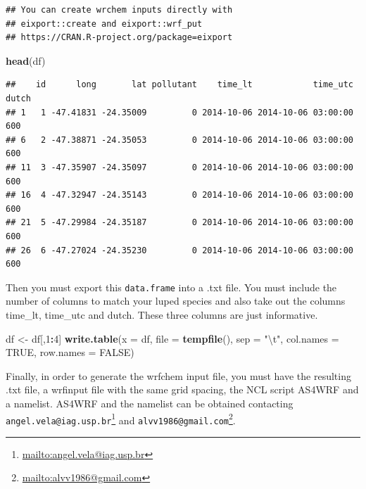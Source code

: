 \documentclass[12pt,graybox,envcountchap,sectrefs]{krantz}
\makeatletter
\newenvironment{Shaded}{\begin{snugshade}}{\end{snugshade}}
\newcommand{\KeywordTok}[1]{\textcolor[rgb]{0.13,0.29,0.53}{\textbf{#1}}}
\newcommand{\DataTypeTok}[1]{\textcolor[rgb]{0.13,0.29,0.53}{#1}}
\newcommand{\DecValTok}[1]{\textcolor[rgb]{0.00,0.00,0.81}{#1}}
\newcommand{\CharTok}[1]{\textcolor[rgb]{0.31,0.60,0.02}{#1}}
\newcommand{\StringTok}[1]{\textcolor[rgb]{0.31,0.60,0.02}{#1}}
\newcommand{\OtherTok}[1]{\textcolor[rgb]{0.56,0.35,0.01}{#1}}
\newcommand{\OperatorTok}[1]{\textcolor[rgb]{0.81,0.36,0.00}{\textbf{#1}}}
\newcommand{\NormalTok}[1]{#1}
\renewcommand{\href}[2]{#2\footnote{\url{#1}}}
\newenvironment{kframe}{%
\medskip{}
\setlength{\fboxsep}{.8em}
 \def\at@end@of@kframe{}%
 \ifinner\ifhmode%
  \def\at@end@of@kframe{\end{minipage}}%
  \begin{minipage}{\columnwidth}%
 \fi\fi%
 \def\FrameCommand##1{\hskip\@totalleftmargin \hskip-\fboxsep
 \colorbox{shadecolor}{##1}\hskip-\fboxsep
     \hskip-\linewidth \hskip-\@totalleftmargin \hskip\columnwidth}%
 \MakeFramed {\advance\hsize-\width
   \@totalleftmargin\z@ \linewidth\hsize
   \@setminipage}}%
 {\par\unskip\endMakeFramed%
 \at@end@of@kframe}
\renewenvironment{Shaded}{\begin{kframe}}{\end{kframe}}
\theoremstyle{definition}
\theoremstyle{definition}
\theoremstyle{definition}
\theoremstyle{remark}
\makeatother
\begin{document}
\begin{verbatim}
## You can create wrchem inputs directly with 
## eixport::create and eixport::wrf_put
## https://CRAN.R-project.org/package=eixport
\end{verbatim}

\begin{Shaded}
\begin{Highlighting}[]
\KeywordTok{head}\NormalTok{(df)}
\end{Highlighting}
\end{Shaded}

\begin{verbatim}
##    id      long       lat pollutant    time_lt            time_utc dutch
## 1   1 -47.41831 -24.35009         0 2014-10-06 2014-10-06 03:00:00   600
## 6   2 -47.38871 -24.35053         0 2014-10-06 2014-10-06 03:00:00   600
## 11  3 -47.35907 -24.35097         0 2014-10-06 2014-10-06 03:00:00   600
## 16  4 -47.32947 -24.35143         0 2014-10-06 2014-10-06 03:00:00   600
## 21  5 -47.29984 -24.35187         0 2014-10-06 2014-10-06 03:00:00   600
## 26  6 -47.27024 -24.35230         0 2014-10-06 2014-10-06 03:00:00   600
\end{verbatim}

Then you must export this \texttt{data.frame} into a .txt file. You must
include the number of columns to match your luped species and also take
out the columns time\_lt, time\_utc and dutch. These three columns are
just informative.

\begin{Shaded}
\begin{Highlighting}[]
\NormalTok{df <-}\StringTok{ }\NormalTok{df[,}\DecValTok{1}\OperatorTok{:}\DecValTok{4}\NormalTok{]}
\KeywordTok{write.table}\NormalTok{(}\DataTypeTok{x =}\NormalTok{ df, }\DataTypeTok{file =} \KeywordTok{tempfile}\NormalTok{(), }\DataTypeTok{sep =} \StringTok{"}\CharTok{\textbackslash{}t}\StringTok{"}\NormalTok{,}
            \DataTypeTok{col.names =} \OtherTok{TRUE}\NormalTok{, }\DataTypeTok{row.names =} \OtherTok{FALSE}\NormalTok{)}
\end{Highlighting}
\end{Shaded}

Finally, in order to generate the wrfchem input file, you must have the
resulting .txt file, a wrfinput file with the same grid spacing, the NCL
script AS4WRF and a namelist. AS4WRF and the namelist can be obtained
contacting
\href{mailto:angel.vela@iag.usp.br}{\nolinkurl{angel.vela@iag.usp.br}}
and \href{mailto:alvv1986@gmail.com}{\nolinkurl{alvv1986@gmail.com}}.
\end{document}
